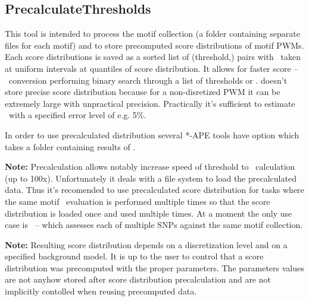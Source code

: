 \subsection{PrecalculateThresholds}
This tool is intended to process the motif collection (a folder containing separate
files for each motif) and to store precomputed score distributions of motif PWMs. Each score distributions is saved as a sorted list of \mbox{(threshold,\pvalue)} pairs with \pvalues\ taken at uniform intervals at quantiles of score distribution. It allows for faster score -- \pvalue\ conversion performing binary search through a list of thresholds or \pvalues.  doesn't store precise score distribution because for a non-disretized PWM it can be extremely large with unpractical precision. Practically it's sufficient to estimate \pvalue\ with a specified error level of e.g. 5\%.

In order to use precalculated distribution several *-APE tools have  option which takes a folder containing results of .

\textbf{Note:} Precalculation allows notably increase speed of threshold to \pvalue\ calculation (up to 100x). Unfortunately it deals with a file system to load the precalculated data. Thus it's recomended to use precalculated score distribution for tasks where the same motif \pvalue\ evaluation is performed multiple times so that the score distribution is loaded once and used multiple times. At a moment the only use case is ~--  which assesses each of multiple SNPs against the same motif collection.

\textbf{Note:} Resulting score distribution depends on a discretization level and on a specified background model. It is up to the user to control that a score distribution was precomputed with the proper parameters. The parameters values are not anyhow stored after score distribution precalculation and are not implicitly contolled when reusing precomputed data.

\usageheader
{}

\example{}

